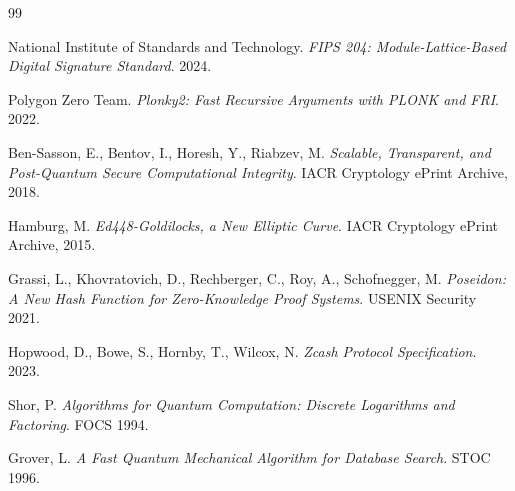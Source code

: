 \documentclass[11pt,a4paper]{article}
\begin{document}
\begin{thebibliography}{99}

National Institute of Standards and Technology.
\textit{FIPS 204: Module-Lattice-Based Digital Signature Standard}.
2024.

Polygon Zero Team.
\textit{Plonky2: Fast Recursive Arguments with PLONK and FRI}.
2022.

Ben-Sasson, E., Bentov, I., Horesh, Y., Riabzev, M.
\textit{Scalable, Transparent, and Post-Quantum Secure Computational Integrity}.
IACR Cryptology ePrint Archive, 2018.

Hamburg, M.
\textit{Ed448-Goldilocks, a New Elliptic Curve}.
IACR Cryptology ePrint Archive, 2015.

Grassi, L., Khovratovich, D., Rechberger, C., Roy, A., Schofnegger, M.
\textit{Poseidon: A New Hash Function for Zero-Knowledge Proof Systems}.
USENIX Security 2021.

Hopwood, D., Bowe, S., Hornby, T., Wilcox, N.
\textit{Zcash Protocol Specification}.
2023.

Shor, P.
\textit{Algorithms for Quantum Computation: Discrete Logarithms and Factoring}.
FOCS 1994.

Grover, L.
\textit{A Fast Quantum Mechanical Algorithm for Database Search}.
STOC 1996.

\end{thebibliography}
\end{document}
